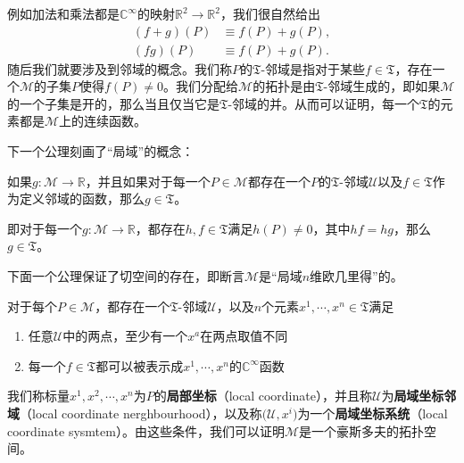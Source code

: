 例如加法和乘法都是$\mathbb{C}^{\infty }$的映射$\mathbb{R}^{2}\rightarrow \mathbb{R}^{2}$，我们很自然给出
\begin{equation*}
	\begin{aligned}
		( f+g)( P) & \equiv f( P) +g( P) ,\\
		( fg)( P) & \equiv f( P) +g( P) .
	\end{aligned}
\end{equation*}
随后我们就要涉及到邻域的概念。我们称$P$的$\mathfrak{T}$-邻域是指对于某些$f\in \mathfrak{T}$，存在一个$\mathcal{M}$的子集$P$使得$f( P) \neq 0$。我们分配给$\mathcal{M}$的拓扑是由$\mathfrak{T}$-邻域生成的，即如果$\mathcal{M}$的一个子集是开的，那么当且仅当它是$\mathfrak{T}$-邻域的并。从而可以证明，每一个$\mathfrak{T}$的元素都是$\mathcal{M}$上的连续函数。



下一个公理刻画了“局域”的概念：

\begin{post}[label={postulate 5.2}]{}
	如果$g:\mathcal{M}\rightarrow \mathbb{R}$，并且如果对于每一个$P\in \mathcal{M}$都存在一个$P$的$\mathfrak{T}$-邻域$\mathcal{U}$以及$f\in \mathfrak{T}$作为定义邻域的函数，那么$g\in \mathfrak{T}$。
	
	即对于每一个$g:\mathcal{M}\rightarrow \mathbb{R}$，都存在$h,f\in \mathfrak{T}$满足$h( P) \neq 0$，其中$hf=hg$，那么$g\in \mathfrak{T}$。
\end{post}

下面一个公理保证了切空间的存在，即断言$\mathcal{M}$是“局域$n$维欧几里得”的。

\begin{post}[label={postulate 5.3}]{}
	对于每个$P\in \mathcal{M}$，都存在一个$\mathfrak{T}$-邻域$\mathcal{U}$，以及$n$个元素$x^{1} ,\cdots ,x^{n} \in \mathfrak{T}$满足
	\begin{enumerate}[label=(\alph*)]
		\item 任意$\mathcal{U}$中的两点，至少有一个$x^{a}$在两点取值不同
		\item 每一个$f\in \mathfrak{T}$都可以被表示成$x^{1} ,\cdots ,x^{n}$的$\mathbb{C}^{\infty }$函数
	\end{enumerate}
\end{post}

我们称标量$x^{1} ,x^{2} ,\cdots ,x^{n}$为$P$的\textbf{局部坐标}（local coordinate），并且称$\mathcal{U}$为\textbf{局域坐标邻域}（local coordinate nerghbourhood），以及称$\mathcal{(U} ,x^{i} )$为一个\textbf{局域坐标系统}（local coordinate sysmtem）。由这些条件，我们可以证明$\mathcal{M}$是一个豪斯多夫的拓扑空间。

